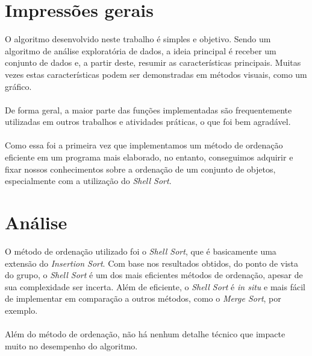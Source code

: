 \documentclass{article}
\begin{document}
\clearpage


\section{Impressões gerais}

\hspace*{\parindent}O algoritmo desenvolvido neste trabalho é simples e objetivo. Sendo um algoritmo de análise exploratória de dados, a ideia principal é receber um conjunto de dados e, a partir deste, resumir as características principais. Muitas vezes estas características podem ser demonstradas em métodos visuais, como um gráfico.\\\\
\hspace*{\parindent}De forma geral, a maior parte das funções implementadas são frequentemente utilizadas em outros trabalhos e atividades práticas, o que foi bem agradável.\\\\
\hspace*{\parindent}Como essa foi a primeira vez que implementamos um método de ordenação eficiente em um programa mais elaborado, no entanto, conseguimos adquirir e fixar nossos conhecimentos sobre a ordenação de um conjunto de objetos, especialmente com a utilização do \textit{Shell Sort}.

\clearpage


\section{Análise}

\hspace*{\parindent}O método de ordenação utilizado foi o \textit{Shell Sort}, que é basicamente uma extensão do \textit{Insertion Sort}. Com base nos resultados obtidos, do ponto de vista do grupo, o \textit{Shell Sort} é um dos mais eficientes métodos de ordenação, apesar de sua complexidade ser incerta. Além de eficiente, o \textit{Shell Sort} é \textit{in situ} e mais fácil de implementar em comparação a outros métodos, como o \textit{Merge Sort}, por exemplo.\\\\
\hspace*{\parindent}Além do método de ordenação, não há nenhum detalhe técnico que impacte muito no desempenho do algoritmo.
\clearpage

\end{document}
